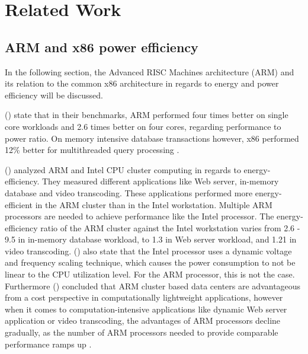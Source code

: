 \section{Related Work}

\subsection{ARM and x86 power efficiency}

In the following section, the Advanced RISC Machines architecture (ARM)
and its relation to the common x86 architecture in regards to 
energy and power efficiency will be discussed.

\citeauthor{maqbool2015evaluating} (\citeyear{maqbool2015evaluating})
state that in their benchmarks,
ARM performed four times better on single core workloads and
2.6 times better on four cores, 
regarding performance to power ratio.
On memory intensive database transactions however, 
x86 performed 12\% better for multithreaded query processing
\cite{maqbool2015evaluating}.

\citeauthor{ou2012energy} (\citeyear{ou2012energy}) analyzed ARM and Intel CPU cluster computing 
in regards to energy-efficiency. They measured different applications
like Web server, in-memory database and video transcoding. These
applications performed more energy-efficient in the ARM cluster than 
in the Intel workstation. Multiple ARM processors are needed to 
achieve performance like the Intel processor. 
The energy-efficiency ratio of the
ARM cluster against the Intel workstation varies from 2.6 - 9.5 in
in-memory database workload, to 1.3 in Web server workload, and 
1.21 in video transcoding. 
\citeauthor{ou2012energy} (\citeyear{ou2012energy}) also state that the Intel processor
uses a dynamic voltage and frequency scaling technique, which 
causes the power consumption to not be linear to the CPU utilization level.
For the ARM processor, this is not the case.
Furthermore \citeauthor{ou2012energy} (\citeyear{ou2012energy}) concluded that ARM cluster 
based data centers are advantageous from a cost perspective
in computationally lightweight applications,
however when it comes to computation-intensive applications
like dynamic Web server application or video transcoding, the advantages
of ARM processors decline gradually, as the number of ARM processors needed 
to provide comparable performance ramps up
\cite{ou2012energy}.

